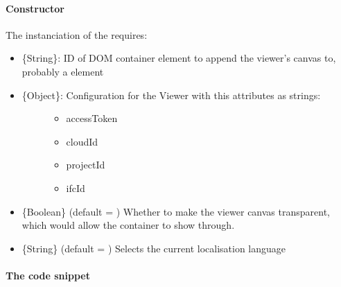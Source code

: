 \documentclass[a4paper,12pt,english]{sphinxmanual}
\begin{document}
\paragraph{Constructor}
\label{\detokenize{viewer/init_viewer:constructor}}
The instanciation of the  requires:
\begin{itemize}
\item {} 
\{String\}: ID of DOM container element to append the viewer’s canvas to, probably a  element

\item {} \begin{description}
\item[{\{Object\}: Configuration for the Viewer with this attributes as strings:}] \leavevmode\begin{itemize}
\item {} 
accessToken

\item {} 
cloudId

\item {} 
projectId

\item {} 
ifcId

\end{itemize}

\end{description}

\item {} 
\{Boolean\} (default = ) Whether to make the viewer canvas transparent, which would allow the container to show through.

\item {} 
\{String\} (default = ) Selects the current localisation language

\end{itemize}


\paragraph{The code snippet}
\label{\detokenize{viewer/init_viewer:the-code-snippet}}
%
\begin{sphinxVerbatim}[commandchars=\\\{\}]
   
   
   
   

     
 
 
 
 
\end{sphinxVerbatim}
\end{document}
